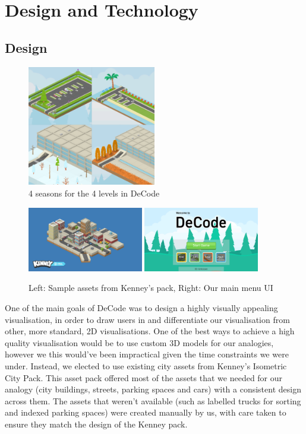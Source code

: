 \documentclass[10pt]{article}
\begin{document}
\section{Design and Technology}
\subsection{Design}
\begin{figure}
  \centering
  \includegraphics[width=0.5\textwidth]{images/seasons.png}
\caption{4 seasons for the 4 levels in DeCode}
\label{fig:seasons}
\end{figure}
\begin{figure}
  \centering
  \includegraphics[width=0.45\textwidth]{images/kenneysample.png}
  \includegraphics[width=0.45\textwidth]{images/mainmenu.png}
\caption{Left: Sample assets from Kenney's pack, Right: Our main menu UI}
\label{fig:designstuff}
\end{figure}
One of the main goals of DeCode was to design a highly visually appealing visualisation, in order to draw users in and differentiate our visualisation from other, more standard, 2D visualisations. One of the best ways to achieve a high quality visualisation would be to use custom 3D models for our analogies, however we this would've been impractical given the time constraints we were under. Instead, we elected to use existing city assets from Kenney's Isometric City Pack\cite{KenneyAssets}. This asset pack offered most of the assets that we needed for our analogy (city buildings, streets, parking spaces and cars) with a consistent design across them. The assets that weren't available (such as labelled trucks for sorting and indexed parking spaces) were created manually by us, with care taken to ensure they match the design of the Kenney pack.\par
\end{document}

